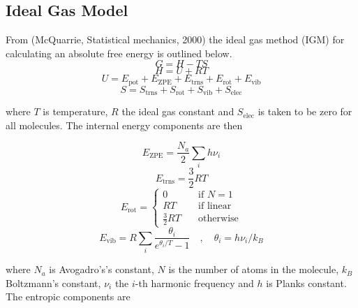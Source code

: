 \documentclass[10pt]{article}
\begin{document}
\subsection{Ideal Gas Model}

From (McQuarrie, Statistical mechanics, 2000) the ideal gas method (IGM) for calculating an absolute free energy is outlined below.
\begin{equation}
	G  = H - TS
\end{equation}
\begin{equation}
	H = U + RT
\end{equation}
\begin{equation}
	U = E_\text{pot} + E_\text{ZPE} + E_\text{trns} + E_\text{rot} + E_\text{vib} \end{equation}
\begin{equation}
	S = S_\text{trns} + S_\text{rot} + S_\text{vib} + S_\text{elec}
\end{equation}

where $T$ is temperature, $R$ the ideal gas constant and $S_\text{elec}$ is taken to be zero for all molecules. The internal energy components are then

\begin{equation}
	E_\text{ZPE} = \frac{N_a}{2}\sum_i h \nu_i 
\end{equation}
\begin{equation}
	E_\text{trns} = \frac{3}{2}RT
\end{equation}
\begin{equation}
	E_\text{rot} =
	\begin{cases}
		0 &\quad \text{if  } N = 1 \\
		RT &\quad \text{if linear} \\
		\frac{3}{2} RT &\quad \text{otherwise} 
	\end{cases}
\end{equation}
\begin{equation}
	E_\text{vib} = R \sum_i \frac{\theta_i}{e^{\theta_i / T} - 1} \quad ,\quad \theta_i = h\nu_i / k_B
\end{equation}

where $N_a$ is Avogadro's's constant, $N$ is the number of atoms in the molecule, $k_B$ Boltzmann's constant, $ \nu_i$ the $i$-th harmonic frequency and $h$ is Planks constant. The entropic components are 
\end{document}
